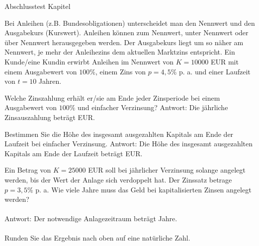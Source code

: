 
\begin{MTest}{Abschlusstest Kapitel }


\begin{MExercise}
Bei Anleihen (z.B. Bundesobligationen) unterscheidet man den Nennwert und den Ausgabekurs (Kurswert).
Anleihen können zum Nennwert, unter Nennwert oder über Nennwert herausgegeben werden.
Der Ausgabekurs liegt um so näher am Nennwert, je mehr der Anleihezins dem aktuellen Marktzins entspricht.
Ein Kunde/eine Kundin erwirbt Anleihen im Nennwert von $K=10000$ EUR mit einem Ausgabewert von $100\%$, einem Zins von $p=4,5\%$ p. a. und einer Laufzeit von $t=10$ Jahren.
\begin{MExerciseItems}
\item{Welche Zinszahlung erhält er/sie am Ende jeder Zinsperiode bei einem Ausgabewert von $100\%$ und einfacher Verzinsung? Antwort: Die jährliche Zinsauszahlung beträgt  EUR.}
\item{Bestimmen Sie die Höhe des insgesamt ausgezahlten Kapitals am Ende der Laufzeit bei einfacher Verzinsung. Antwort: Die Höhe des insgesamt ausgezahlten Kapitals am Ende der Laufzeit beträgt  EUR.}
\end{MExerciseItems}
\end{MExercise}

\begin{MExercise}
Ein Betrag von $K=25000$ EUR soll bei jährlicher Verzinsung solange angelegt werden, bis der Wert der Anlage sich verdoppelt hat. Der Zinssatz betrage $p=3,5\%$ p. a.
Wie viele Jahre muss das Geld bei kapitalisierten Zinsen angelegt werden?
\ \\ \ \\
Antwort: Der notwendige Anlagezeitraum beträgt  Jahre.
\ \\ \ \\
Runden Sie das Ergebnis nach oben auf eine natürliche Zahl.
\end{MExercise}


\end{MTest}
